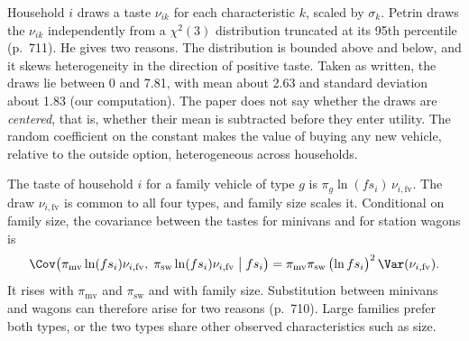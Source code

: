  Household $i$ draws a taste $\nu_{ik}$ for each characteristic $k$,
scaled by $\sigma_k$. Petrin draws the $\nu_{ik}$ independently from a $\chi^2(3)$ distribution truncated at its 95th
percentile (p.~711). He gives two reasons. The distribution is bounded above and below, and it skews heterogeneity in
the direction of positive taste. Taken as written, the draws lie between 0 and 7.81, with mean about 2.63 and standard
deviation about 1.83 (our computation). The paper does not say whether the draws are \emph{centered}, that is, whether
their mean is subtracted before they enter utility. The random coefficient on the constant makes the value of buying any new vehicle,
relative to the outside option, heterogeneous across households.

 The taste of household $i$ for a family vehicle of type $g$ is
$\pi_g \ln(fs_i)\,\nu_{i,\mathrm{fv}}$. The draw $\nu_{i,\mathrm{fv}}$ is common to all four types, and family size
scales it. Conditional on family size, the covariance between the tastes for minivans and for station wagons is
\begin{equation}\label{eq:10-petrin-cov}
  \Cov\bigl(\pi_{\mathrm{mv}}\ln(fs_i)\nu_{i,\mathrm{fv}},\; \pi_{\mathrm{sw}}\ln(fs_i)\nu_{i,\mathrm{fv}} \bigm| fs_i\bigr)
  = \pi_{\mathrm{mv}}\pi_{\mathrm{sw}}\,\bigl(\ln fs_i\bigr)^2\,\Var(\nu_{i,\mathrm{fv}}) .
\end{equation}
It rises with $\pi_{\mathrm{mv}}$ and $\pi_{\mathrm{sw}}$ and with family size. Substitution between minivans and
wagons can therefore arise for two reasons (p.~710). Large families prefer both types, or the two types share other
observed characteristics such as size.


